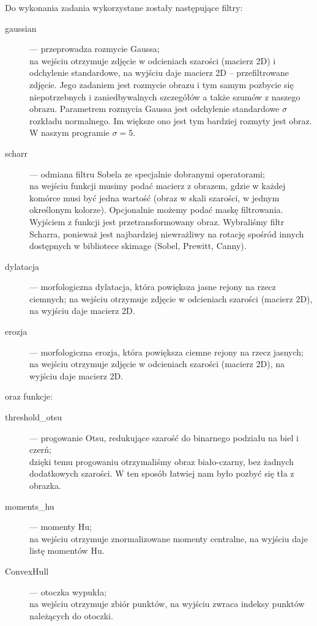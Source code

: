 \documentclass{article}
\begin{document}
Do wykonania zadania wykorzystane zostały następujące filtry:
\begin{description}
\item[gaussian] — przeprowadza rozmycie Gaussa;\\
na wejściu otrzymuje zdjęcie w odcieniach szarości (macierz 2D) i odchylenie standardowe, na wyjściu daje macierz 2D – przefiltrowane zdjęcie.
Jego zadaniem jest rozmycie obrazu i tym samym pozbycie się niepotrzebnych i zaniedbywalnych szczegółów  a także szumów z naszego obrazu. Parametrem rozmycia Gaussa jest odchylenie standardowe $\sigma$ rozkładu normalnego. Im większe ono jest tym bardziej rozmyty jest obraz. W naszym programie $\sigma = 5$. 
\item[scharr] — odmiana filtru Sobela ze specjalnie dobranymi operatorami;\\
na wejściu funkcji musimy podać macierz z obrazem, gdzie w każdej komórce musi być jedna wartość (obraz w skali szarości, w jednym określonym kolorze). Opcjonalnie możemy podać maskę filtrowania. Wyjściem z funkcji jest przetransformowany obraz. Wybraliśmy filtr Scharra, ponieważ jest najbardziej niewrażliwy na rotację spośród innych dostępnych w bibliotece skimage (Sobel, Prewitt, Canny).
\item[dylatacja] — morfologiczna dylatacja, która powiększa jasne rejony na rzecz ciemnych;
na wejściu otrzymuje zdjęcie w odcieniach szarości (macierz 2D), na wyjściu daje macierz 2D.
\item[erozja] — morfologiczna erozja, która powiększa ciemne rejony na rzecz jasnych;
na wejściu otrzymuje zdjęcie w odcieniach szarości (macierz 2D), na wyjściu daje macierz 2D.
\end{description}
oraz funkcje:
\begin{description}
\item[threshold\_otsu] — progowanie Otsu, redukujące szarość do binarnego podziału na biel i czerń;\\
dzięki temu progowaniu otrzymaliśmy obraz biało-czarny, bez żadnych dodatkowych szarości. W ten sposób łatwiej nam było pozbyć się tła z obrazka.
\item[moments\_hu] — momenty Hu;\\
na wejściu otrzymuje znormalizowane momenty centralne, na wyjściu daje listę momentów Hu.
\item[ConvexHull] — otoczka wypukła;\\
na wejściu otrzymuje zbiór punktów, na wyjściu zwraca indeksy punktów należących do otoczki.
\end{description}
\end{document}
